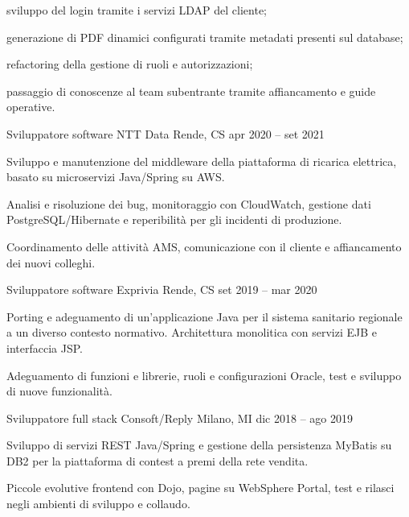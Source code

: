 \documentclass[]{style}
\begin{document}
\begin{cventries}
{\begin{cventryparagraph}
    	{\begin{cventryparagraphlist}
    		\item {sviluppo del login tramite i servizi LDAP del cliente;}
    		\item {generazione di PDF dinamici configurati tramite metadati presenti sul database;}
    		\item {refactoring della gestione di ruoli e autorizzazioni;}
    		\item {passaggio di conoscenze al team subentrante tramite affiancamento e guide operative.}
    	\end{cventryparagraphlist}}
	\end{cventryparagraph}}
	\cventry
	{Sviluppatore software}
	{NTT Data}
	{Rende, CS}
	{apr 2020 -- set 2021}
	{\begin{cventryparagraph}
		\item {}
		\item {Sviluppo e manutenzione del middleware della piattaforma di ricarica elettrica, basato su microservizi Java/Spring su AWS.}
		\item {Analisi e risoluzione dei bug, monitoraggio con CloudWatch, gestione dati PostgreSQL/Hibernate e reperibilità per gli incidenti di produzione.}
		\item {Coordinamento delle attività AMS, comunicazione con il cliente e affiancamento dei nuovi colleghi.}
	\end{cventryparagraph}}
	\cventry
	{Sviluppatore software}
	{Exprivia}
	{Rende, CS}
	{set 2019 -- mar 2020}
	{\begin{cventryparagraph}
		\item {\cvprojectheading{SISR Edotto}{}}
		\item {Porting e adeguamento di un'applicazione Java per il sistema sanitario regionale a un diverso contesto normativo. Architettura monolitica con servizi EJB e interfaccia JSP.}
		\item {Adeguamento di funzioni e librerie, ruoli e configurazioni Oracle, test e sviluppo di nuove funzionalità.}
	\end{cventryparagraph}}
	\cventry
	{Sviluppatore full stack}
	{Consoft/Reply}
	{Milano, MI}
	{dic 2018 -- ago 2019}
	{\begin{cventryparagraph}
		\item {\cvprojectheading{UnipolSai Contest}{}}
		\item {Sviluppo di servizi REST Java/Spring e gestione della persistenza MyBatis su DB2 per la piattaforma di contest a premi della rete vendita.}
		\item {Piccole evolutive frontend con Dojo, pagine su WebSphere Portal, test e rilasci negli ambienti di sviluppo e collaudo.}
	\end{cventryparagraph}}
\end{cventries}
\end{document}
